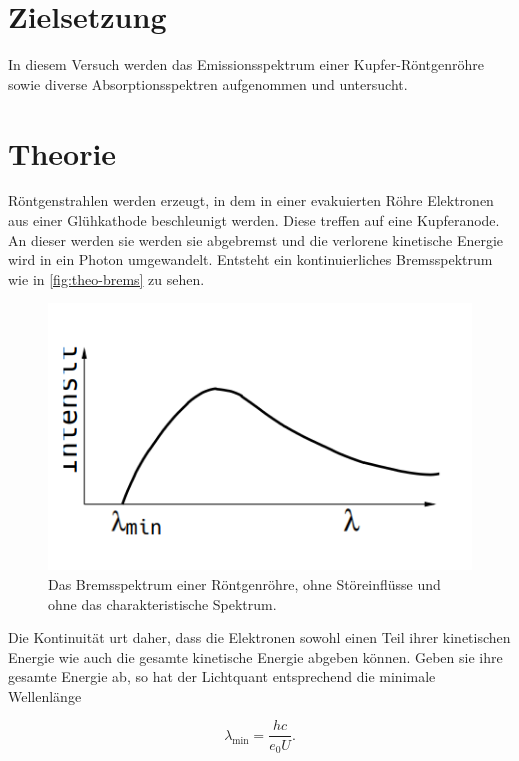 \section{Zielsetzung}
In diesem Versuch werden das Emissionsspektrum einer Kupfer-Röntgenröhre sowie diverse Absorptionsspektren aufgenommen und untersucht.

\section{Theorie}
\label{sec:Theorie}

Röntgenstrahlen werden erzeugt, in dem in einer evakuierten Röhre Elektronen aus einer Glühkathode beschleunigt werden.
Diese treffen auf eine Kupferanode. An dieser werden sie werden sie abgebremst und die verlorene kinetische Energie wird in ein Photon umgewandelt. Entsteht ein kontinuierliches Bremsspektrum wie in \autoref{fig:theo-brems} zu sehen.

\begin{figure}
    \centering
    \includegraphics[width=\textwidth]{content/bremsspektrum.PNG}
    \caption{Das Bremsspektrum einer Röntgenröhre, ohne Störeinflüsse und ohne das charakteristische Spektrum\cite{V602}.}
    \label{fig:theo-brems}
\end{figure}

Die Kontinuität urt daher, dass die Elektronen sowohl einen Teil ihrer kinetischen Energie wie auch die gesamte kinetische Energie abgeben können.
Geben sie ihre gesamte Energie ab, so hat der Lichtquant entsprechend die minimale Wellenlänge

\begin{equation}
    \label{eqn:lambda-min}
    \lambda_\text{min} = \frac{h c}{e_0 U}.
\end{equation}

